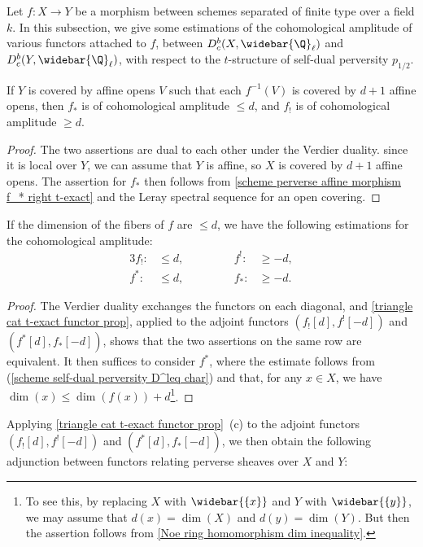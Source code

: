 Let $f:X\to Y$ be a morphism between schemes separated of finite type over a field $k$. In this subsection, we give some estimations of the cohomological amplitude of various functors attached to $f$, between $D^b_c(X,\widebar{\Q}_\ell)$ and $D^b_c(Y,\widebar{\Q}_\ell)$, with respect to the $t$-structure of self-dual perversity $p_{1/2}$.

\begin{proposition}\label{scheme perverse morphism integral c.amp of direct image}
If $Y$ is covered by affine opens $V$ such that each $f^{-1}(V)$ is covered by $d+1$ affine opens, then $f_*$ is of cohomological amplitude $\leq d$, and $f_!$ is of cohomological amplitude $\geq d$.
\end{proposition}
\begin{proof}
The two assertions are dual to each other under the Verdier duality. since it is local over $Y$, we can assume that $Y$ is affine, so $X$ is covered by $d+1$ affine opens. The assertion for $f_*$ then follows from \cref{scheme perverse affine morphism f_* right t-exact} and the Leray spectral sequence for an open covering.
\end{proof}

\begin{proposition}\label{scheme perverse morphism c.amp fiber dimension estimate}
If the dimension of the fibers of $f$ are $\leq d$, we have the following estimations for the cohomological amplitude:
\begin{alignat*}{3}
f_!:&\leq d,&\quad\quad &&f^!:&\geq -d,\\
f^*:&\leq d,&\quad\quad &&f_*:&\geq -d.
\end{alignat*}
\end{proposition}
\begin{proof}
The Verdier duality exchanges the functors on each diagonal, and \cref{triangle cat t-exact functor prop}, applied to the adjoint functors $(f_![d],f^![-d])$ and $(f^*[d],f_*[-d])$, shows that the two assertions on the same row are equivalent. It then suffices to consider $f^*$, where the estimate follows from (\ref{scheme self-dual perversity D^leq char}) and that, for any $x\in X$, we have $\dim(x)\leq\dim(f(x))+d$\footnote{To see this, by replacing $X$ with $\widebar{\{x\}}$ and $Y$ with $\widebar{\{y\}}$, we may assume that $d(x)=\dim(X)$ and $d(y)=\dim(Y)$. But then the assertion follows from \cref{Noe ring homomorphism dim inequality}.}.
\end{proof}

Applying \cref{triangle cat t-exact functor prop}~(c) to the adjoint functors $(f_![d],f^![-d])$ and $(f^*[d],f_*[-d])$, we then obtain the following adjunction between functors relating perverse sheaves over $X$ and $Y$:

